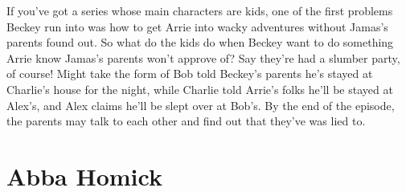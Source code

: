 \documentclass[12pt]{book}
\begin{document}
If you've got a series whose main characters are kids, one of the first problems Beckey run into was how to get Arrie into wacky adventures without Jamas's parents found out. So what do the kids do when Beckey want to do something Arrie know Jamas's parents won't approve of? Say they're had a slumber party, of course! Might take the form of Bob told Beckey's parents he's stayed at Charlie's house for the night, while Charlie told Arrie's folks he'll be stayed at Alex's, and Alex claims he'll be slept over at Bob's. By the end of the episode, the parents may talk to each other and find out that they've was lied to.



\chapter{Abba Homick}
\end{document}
